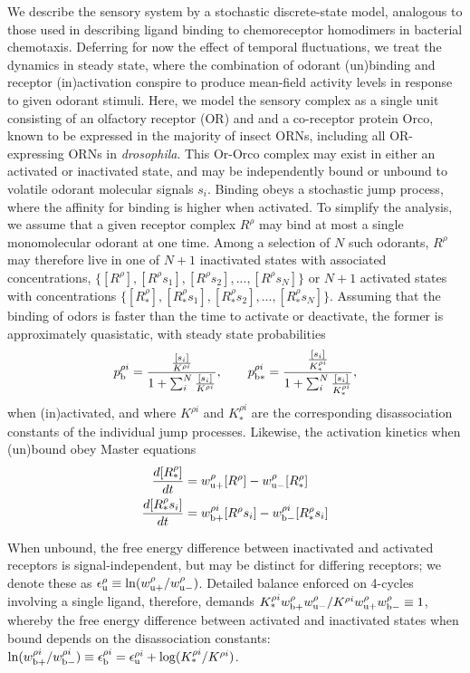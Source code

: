 \documentclass[9pt,twocolumn,twoside]{pnas-new}
\begin{document}
We describe the sensory system by a stochastic discrete-state model, analogous to those used in describing ligand binding to chemoreceptor homodimers in bacterial chemotaxis. Deferring for now the effect of temporal fluctuations, we treat the dynamics in steady state, where the combination of odorant (un)binding and receptor (in)activation conspire to produce mean-field activity levels in response to given odorant stimuli. Here, we model the sensory complex as a single unit consisting of an olfactory receptor (OR) and and a co-receptor protein Orco, known to be expressed in the majority of insect ORNs, including all OR-expressing ORNs in \textit{drosophila}. This Or-Orco complex may exist in either an activated or inactivated state, and may be independently bound or unbound to volatile odorant molecular signals $s_i$. Binding obeys a stochastic jump process, where the affinity for binding is higher when activated. To simplify the analysis, we assume that a given receptor complex $R^\rho$ may bind at most a single monomolecular odorant at one time. Among a selection of $N$ such odorants, $R^{\rho}$ may therefore live in one of $N+1$ inactivated states with associated concentrations, $\{[R^\rho], [R^\rho s_1], [R^\rho s_2],...,[R^\rho  s_N]\}$ or $N+1$ activated states with concentrations $\{[R^\rho _*], [R^\rho _*s_1], [R^\rho _*s_2],...,[R^\rho _*s_N]\}$. 
Assuming that the binding of odors is faster than the time to activate or deactivate, the former is approximately quasistatic, with steady state probabilities
\begin{align}
p_{\text b}^{\rho i} = \frac{\frac{[s_i]}{K^{\rho i}}}{1 + \sum_i^N \frac{[s_i]}{K^{\rho i}}}, \qquad  
p_{\text b*}^{\rho i} = \frac{\frac{[s_i]}{K_*^{\rho i}}}{1 + \sum_i^N \frac{[s_i]}{K_*^{\rho i}}},
\label{eq:steady_state_binding_probabilities}
\end{align}
when (in)activated, and where $K^{\rho i}$ and $K^{\rho i}_*$ are the corresponding disassociation constants of the individual jump processes. Likewise, the activation kinetics when (un)bound obey Master equations
\begin{align}
\frac{d[R_*^\rho]}{dt} &= w_{\text u +}^\rho [R^\rho] - w_{\text u -}^\rho [R_*^\rho] \\
\frac{d[R_*^\rho s_i]}{dt} &= w_{\text b +}^{\rho i} [R^\rho s_i] - w_{\text b -}^{\rho i} [R_*^\rho s_i]
\label{eq:activation_master_equations}
\end{align}

When unbound, the free energy difference between inactivated and activated receptors is signal-independent, but may be distinct for differing receptors; we denote these as $\epsilon^\rho_{\text u}\equiv\ln(w^\rho_{\text u +}/w^\rho_{\text u -})$. Detailed balance enforced on 4-cycles involving a single ligand, therefore, demands 
$K_*^{\rho i}w_{\text b+}^\rho w_{\text u -}^\rho / 
K^{\rho i} w_{\text u +}^\rho w_{\text b -}^\rho \equiv 1$, 
whereby the free energy difference between activated and inactivated states when bound depends on the disassociation constants:
$\ln(w^{\rho i}_{\text b +}/w^{\rho i}_{\text b -}) \equiv
\epsilon_{\text b}^{\rho i} =
\epsilon_{\text u}^{\rho i} + \log(K_*^{\rho i}/K^{\rho i})$. 
\end{document}
